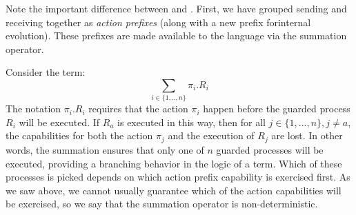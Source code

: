 
Note the important difference between  and .  
First, we have grouped sending and receiving together as \emph{action prefixes} (along with a new prefix forinternal evolution). 
These prefixes are made available to the language via the summation operator. 

Consider the term:
\[
	\sum_{i\in \{1,..,n\}} \pi_i.R_i
\]
The notation $\pi_i.R_i$ requires that the action $\pi_i$ happen before the guarded process $R_i$ will be executed.  
If $R_a$ is executed in this way, then for all $j\in \{1,...,n\},j \neq a$, the capabilities for both the action $\pi_j$ and the execution of $R_j$ are lost.  
In other words, the summation ensures that only one of $n$ guarded processes will be executed, providing a branching behavior in the logic of a term. 
Which of these processes is picked depends on which action prefix capability is exercised first.  As we saw above, we cannot usually guarantee which of the action capabilities will be exercised, so we say that the summation operator is non-deterministic.

